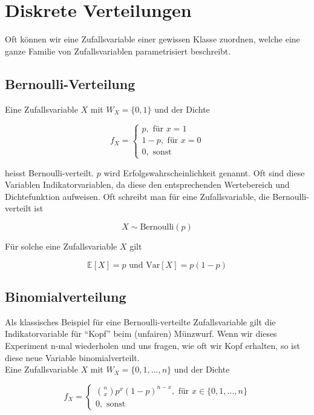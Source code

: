 \chapter{Diskrete Verteilungen}

Oft können wir eine Zufallsvariable einer gewissen Klasse zuordnen, welche eine ganze Familie von
Zufallsvariablen parametrisiert beschreibt.

\section{Bernoulli-Verteilung}

Eine Zufallsvariable $X$ mit $W_X = \{0,1\}$ und der Dichte

$$f_X = \begin{cases}
    p, \text{   für } x = 1 \\
    1 - p, \text{   für } x = 0 \\
    0, \text{   sonst}
\end{cases}$$

heisst Bernoulli-verteilt. $p$ wird Erfolgswahrscheinlichkeit genannt. Oft sind diese Variablen 
Indikatorvariablen, da diese den entsprechenden Wertebereich und Dichtefunktion aufweisen. Oft 
schreibt man für eine Zufallsvariable, die Bernoulli-verteilt ist

$$X \sim \text{Bernoulli}(p)$$

Für solche eine Zufallsvariable $X$ gilt

$$\mathbb{E}[X] = p \text{  und Var}[X] = p(1-p) $$

\section{Binomialverteilung}

Als klassisches Beispiel für eine Bernoulli-verteilte Zufallsvariable gilt die Indikatorvariable für 
“Kopf” beim (unfairen) Münzwurf. Wenn wir dieses Experiment n-mal wiederholen und uns fragen, wie oft 
wir Kopf erhalten, so ist diese neue Variable binomialverteilt. \\

Eine Zufallsvariable $X$ mit $W_X = \{0, 1, ..., n\}$ und der Dichte

$$f_X = \begin{cases}
    \binom{n}{x}p^x(1-p)^{n-x} , \text{   für } x \in \{0, 1, ..., n\} \\
    0, \text{   sonst}
\end{cases}$$

